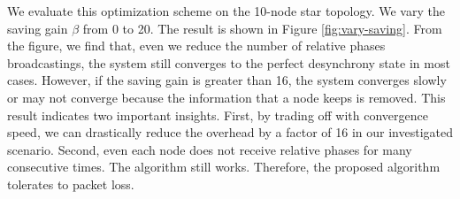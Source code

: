 We evaluate this optimization scheme on the 10-node star topology. We vary the saving gain $\beta$ from 0 to 20. 
The result is shown in Figure \ref{fig:vary-saving}.
From the figure, we find that, even we reduce the number of relative phases broadcastings, the system still converges to the perfect desynchrony state in most cases. However, if the saving gain is greater than 16, the system converges slowly or may not converge because the information that a node keeps is removed.
This result indicates two important insights.
First, by trading off with convergence speed, we can drastically reduce the overhead by a factor of 16 in our investigated scenario. Second, even each node does not receive relative phases for many consecutive times. The algorithm still works. Therefore, the proposed algorithm tolerates to packet loss.

